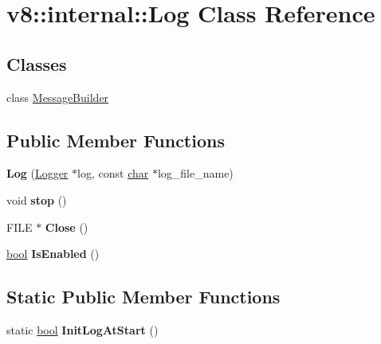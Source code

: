 \hypertarget{classv8_1_1internal_1_1Log}{}\section{v8\+:\+:internal\+:\+:Log Class Reference}
\label{classv8_1_1internal_1_1Log}
\subsection*{Classes}
\begin{DoxyCompactItemize}
\item 
class \mbox{\hyperlink{classv8_1_1internal_1_1Log_1_1MessageBuilder}{Message\+Builder}}
\end{DoxyCompactItemize}
\subsection*{Public Member Functions}
\begin{DoxyCompactItemize}
\item 
\mbox{\label{classv8_1_1internal_1_1Log_abfdef596991b63ba102eb24034ecb520}} 
{\bfseries Log} (\mbox{\hyperlink{classv8_1_1internal_1_1Logger}{Logger}} $\ast$log, const \mbox{\hyperlink{classchar}{char}} $\ast$log\+\_\+file\+\_\+name)
\item 
\mbox{\label{classv8_1_1internal_1_1Log_a495b1e6c4a7b2b77772319711e5006b0}} 
void {\bfseries stop} ()
\item 
\mbox{\label{classv8_1_1internal_1_1Log_a696f45100002e8105c4d70e8cb5a9cab}} 
F\+I\+LE $\ast$ {\bfseries Close} ()
\item 
\mbox{\label{classv8_1_1internal_1_1Log_a0208fed7368c378edca31079e71bb668}} 
\mbox{\hyperlink{classbool}{bool}} {\bfseries Is\+Enabled} ()
\end{DoxyCompactItemize}
\subsection*{Static Public Member Functions}
\begin{DoxyCompactItemize}
\item 
\mbox{\label{classv8_1_1internal_1_1Log_a7dac4222ea501bc24435d3b3b3eddf9b}} 
static \mbox{\hyperlink{classbool}{bool}} {\bfseries Init\+Log\+At\+Start} ()
\end{DoxyCompactItemize}

